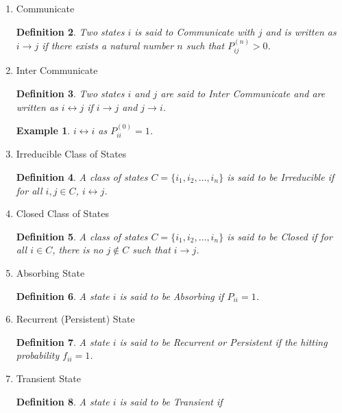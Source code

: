 \documentclass{article}
\newtheorem{definition}{Definition}[section]
\newtheorem{example}{Example}[section]
\begin{document}
\begin{enumerate}
\begin{definition}
          We use $T^{j}$ to denote the hitting time of state $j$ starting from the current state.
        \end{definition}
  \item Communicate
        \begin{definition}
          Two states $i$ is said to Communicate with $j$ and is written as
          $i \rightarrow j$
          if there exists a natural number $n$ such that
          $P^{(n)}_{ij} > 0$.
        \end{definition}
  \item Inter Communicate
        \begin{definition}
          Two states $i$ and $j$ are said to Inter Communicate and are written as
          $i \leftrightarrow j$
          if $i \rightarrow j$ and $j \rightarrow i$.
        \end{definition}
        \begin{example}
          $i \leftrightarrow i$ as $P^{(0)}_{ii} = 1$.
        \end{example}
  \item Irreducible Class of States
        \begin{definition}
          A class of states $
            C = \{i_1, i_2, \ldots, i_n\}
          $ is said to be Irreducible if
          for all $i, j \in C$, $i \leftrightarrow j$.
        \end{definition}
  \item Closed Class of States
        \begin{definition}
          A class of states $
            C = \{i_1, i_2, \ldots, i_n\}
          $ is said to be Closed if
          for all $i \in C$, there is no $j \notin C$ such that $i \rightarrow j$.
        \end{definition}
  \item Absorbing State
        \begin{definition}
          A state $i$ is said to be Absorbing if $P_{ii} = 1$.
        \end{definition}
  \item Recurrent (Persistent) State
        \begin{definition}
          A state $i$ is said to be Recurrent or Persistent if
          the hitting probability $f_{ii} = 1$.
        \end{definition}
  \item Transient State
        \begin{definition}
          A state $i$ is said to be Transient if

\end{definition}
\end{enumerate}
\end{document}
